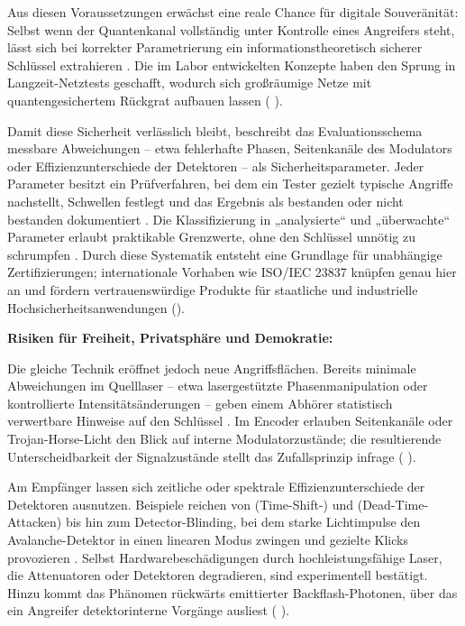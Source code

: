 Aus diesen Voraussetzungen erwächst eine reale Chance für digitale Souveränität: Selbst wenn der Quantenkanal vollständig unter Kontrolle eines Angreifers steht, lässt sich bei korrekter Parametrierung ein informationstheoretisch sicherer Schlüssel extrahieren . Die im Labor entwickelten Konzepte haben den Sprung in Langzeit-Netztests geschafft, wodurch sich großräumige Netze mit quantengesichertem Rückgrat aufbauen lassen (\cite{sunReviewSecurityEvaluation2022} ).

Damit diese Sicherheit verlässlich bleibt, beschreibt das Evaluationsschema messbare Abweichungen – etwa fehlerhafte Phasen, Seitenkanäle des Modulators oder Effizienzunterschiede der Detektoren – als Sicherheitsparameter. Jeder Parameter besitzt ein Prüfverfahren, bei dem ein Tester gezielt typische Angriffe nachstellt, Schwellen festlegt und das Ergebnis als bestanden oder nicht bestanden dokumentiert . Die Klassifizierung in „analysierte“ und „überwachte“ Parameter erlaubt praktikable Grenzwerte, ohne den Schlüssel unnötig zu schrumpfen . Durch diese Systematik entsteht eine Grundlage für unabhängige Zertifizierungen; internationale Vorhaben wie ISO/IEC 23837 knüpfen genau hier an und fördern vertrauenswürdige Produkte für staatliche und industrielle Hochsicherheitsanwendungen (\cite{sunReviewSecurityEvaluation2022}).

\textbf{Risiken für Freiheit, Privatsphäre und Demokratie:}

Die gleiche Technik eröffnet jedoch neue Angriffsflächen. Bereits minimale Abweichungen im Quelllaser – etwa lasergestützte Phasenmanipulation oder kontrollierte Intensitätsänderungen – geben einem Abhörer statistisch verwertbare Hinweise auf den Schlüssel . Im Encoder erlauben Seitenkanäle oder Trojan-Horse-Licht den Blick auf interne Modulatorzustände; die resultierende Unterscheidbarkeit der Signalzustände stellt das Zufallsprinzip infrage (\cite{sunReviewSecurityEvaluation2022} ).

Am Empfänger lassen sich zeitliche oder spektrale Effizienzunterschiede der Detektoren ausnutzen. Beispiele reichen von (Time-Shift-) und (Dead-Time-Attacken) bis hin zum Detector-Blinding, bei dem starke Lichtimpulse den Avalanche-Detektor in einen linearen Modus zwingen und gezielte Klicks provozieren . Selbst Hardwarebeschädigungen durch hochleistungsfähige Laser, die Attenuatoren oder Detektoren degradieren, sind experimentell bestätigt. Hinzu kommt das Phänomen rückwärts emittierter Backflash-Photonen, über das ein Angreifer detektorinterne Vorgänge ausliest (\cite{sunReviewSecurityEvaluation2022} ).

